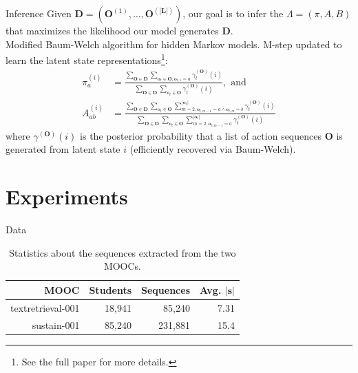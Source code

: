 \documentclass[10pt]{beamer}
\begin{document}
\begin{frame}{Inference}
    \small
    Given $\mathbf{D} = (\mathbf{O}^{(1)}, \ldots,
    \mathbf{O}^{(|\mathbf{L}|)})$, our goal is to infer the $\Lambda = (\pi, A,
    B)$ that maximizes the likelihood our model generates $\mathbf{D}$.
    \\[\baselineskip]
    Modified Baum-Welch algorithm for hidden
    Markov models. M-step updated to learn the latent state
    representations\footnote{See the full paper for more details.}:
    \begin{align*}
      \pi^{(i)}_{a} &= \frac{\sum_{\mathbf{O} \in \mathbf{D}}
      \sum_{\mathbf{o}_t \in \mathbf{O},\mathbf{o}_{t,1} = a}
      \gamma^{(\mathbf{O})}_t(i)} {\sum_{\mathbf{O} \in \mathbf{D}}
      \sum_{\mathbf{o}_t \in \mathbf{O}} \gamma^{(\mathbf{O})}_t(i)},
      \text{ and }\\
      A^{(i)}_{ab} &= \frac{\sum_{\mathbf{O} \in \mathbf{D}}
      \sum_{\mathbf{o}_t \in \mathbf{O}} \sum_{m=2,\mathbf{o}_{t,m-1}=a
      \land \mathbf{o}_{t,m} = b}^{|\mathbf{o}_{t}|}
      \gamma^{(\mathbf{O})}_t(i)} {\sum_{\mathbf{O} \in \mathbf{D}}
      \sum_{\mathbf{o}_t \in \mathbf{O}}
      \sum_{m=2,\mathbf{o}_{t,m-1}=a}^{|\mathbf{o}_{t}|}
      \gamma^{(\mathbf{O})}_t(i)}
    \end{align*}
    where $\gamma^{(\mathbf{O})}(i)$ is the posterior probability that a
    list of action sequences $\mathbf{O}$ is generated from latent state
    $i$ (efficiently recovered via Baum-Welch).
\end{frame}

\section{Experiments}

\newcommand{\textretrieval}{textretrieval-001}
\newcommand{\sustain}{sustain-001}
\newcommand{\UIUC}{UIUC}

\begin{frame}{Data}
\begin{table}
  \begin{center}
    \caption{Statistics about the sequences extracted from the two MOOCs.}
    \label{table:datasets}
    \begin{tabular}{rrrr}
      \textbf{MOOC} & \textbf{Students} & \textbf{Sequences} & \textbf{Avg.
      $|\mathbf{s}|$}\\\hline
      \textretrieval{} & 18,941 & 85,240 & 7.31\\
      \sustain{} & 85,240 & 231,881 & 15.4
    \end{tabular}
  \end{center}
\end{table}
\end{frame}
\end{document}

